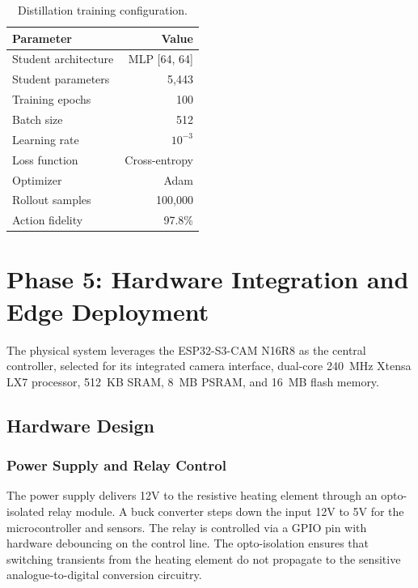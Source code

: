     \begin{table}[ht]
        \caption{Distillation training configuration.}
        \label{tab:distill_config}
        \centering
        \begin{tabular}{lr}
            \hline
            \textbf{Parameter} & \textbf{Value} \\
            \hline
            Student architecture & MLP [64, 64] \\
            Student parameters & 5,443 \\
            Training epochs & 100 \\
            Batch size & 512 \\
            Learning rate & $10^{-3}$ \\
            Loss function & Cross-entropy \\
            Optimizer & Adam \\
            Rollout samples & 100,000 \\
            Action fidelity & 97.8\% \\
            \hline
        \end{tabular}
    \end{table}



\section{Phase 5: Hardware Integration and Edge Deployment}
    \label{sec:Hardware}

    The physical system leverages the ESP32-S3-CAM N16R8 as the central controller, selected for its integrated camera interface, dual-core 240~MHz Xtensa LX7 processor, 512~KB SRAM, 8~MB PSRAM, and 16~MB flash memory.

    \subsection{Hardware Design}
        \label{subsec:Hardware Design}

    \subsubsection{Power Supply and Relay Control}

    The power supply delivers 12V to the resistive heating element through an opto-isolated relay module. A buck converter steps down the input 12V to 5V for the microcontroller and sensors. The relay is controlled via a GPIO pin with hardware debouncing on the control line. The opto-isolation ensures that switching transients from the heating element do not propagate to the sensitive analogue-to-digital conversion circuitry.

